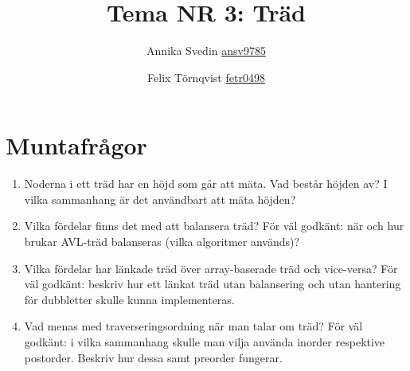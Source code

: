 \documentclass[a5paper,10pt,oneside]{article}
\title{Tema NR 3: Träd}
\author{Annika Svedin \url{ansv9785} \and Felix Törnqvist \url{fetr0498}}
\begin{document}
\maketitle

\section*{Muntafrågor}

\begin{enumerate}

\item

Noderna i ett träd har en höjd som går att mäta. Vad består höjden av? I vilka sammanhang är det användbart att mäta höjden?



\item
Vilka fördelar finns det med att balansera träd? För väl godkänt: när och hur brukar AVL-träd balanseras (vilka algoritmer används)?

\item
Vilka fördelar har länkade träd över array-baserade träd och vice-versa? För väl godkänt: beskriv hur ett länkat träd utan balansering och utan hantering för dubbletter skulle kunna implementeras.

\item
Vad menas med traverseringsordning när man talar om träd? För väl godkänt: i vilka sammanhang skulle man vilja använda inorder respektive postorder. Beskriv hur dessa samt preorder fungerar.

\end{enumerate}
\end{document}
